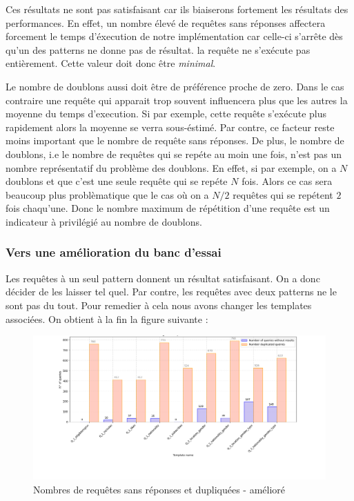 \documentclass[12pt,titlepage]{article}
\begin{document}
Ces résultats ne sont pas satisfaisant car ils biaiserons fortement les résultats des performances. En effet, un nombre élevé de requêtes sans réponses affectera forcement le temps d'éxecution de notre implémentation car celle-ci s'arrête dès qu'un des patterns ne donne pas de résultat. la requête ne s'exécute pas entièrement. Cette valeur doit donc être \textit{minimal}.

Le nombre de doublons aussi doit être de préférence proche de zero. Dans le cas contraire une requête qui apparait trop souvent influencera plus que les autres la moyenne du temps d'execution. Si par exemple, cette requête s'exécute plus rapidement alors la moyenne se verra sous-éstimé. Par contre, ce facteur reste moins important que le nombre de requête sans réponses. De plus, le nombre de doublons, i.e le nombre de requêtes qui se repéte au moin une fois, n'est pas un nombre représentatif du problème des doublons. En effet, si par exemple, on a $N$ doublons et que c'est une seule requête qui se repéte $N$ fois. Alors ce cas sera beaucoup plus problèmatique que le cas où on a $N/2$ requêtes qui se repétent $2$ fois chaqu'une. Donc le nombre maximum de répétition d'une requête est un indicateur à privilégié au nombre de doublons.

\subsubsection{Vers une amélioration du banc d'essai}

Les requêtes à un seul pattern donnent un résultat satisfaisant. On a donc décider de les laisser tel quel. Par contre, les requêtes avec deux patterns ne le sont pas du tout. Pour remedier à cela nous avons changer les templates associées. On obtient à la fin la figure suivante : 

\begin{figure}[!h]
  \centering
  \includegraphics[width=1.\textwidth]{img/zero_dup_per_template_ameliore.png}
  \caption{Nombres de requêtes sans réponses et dupliquées - amélioré}
  \label{zerodup2}
\end{figure}
\end{document}
